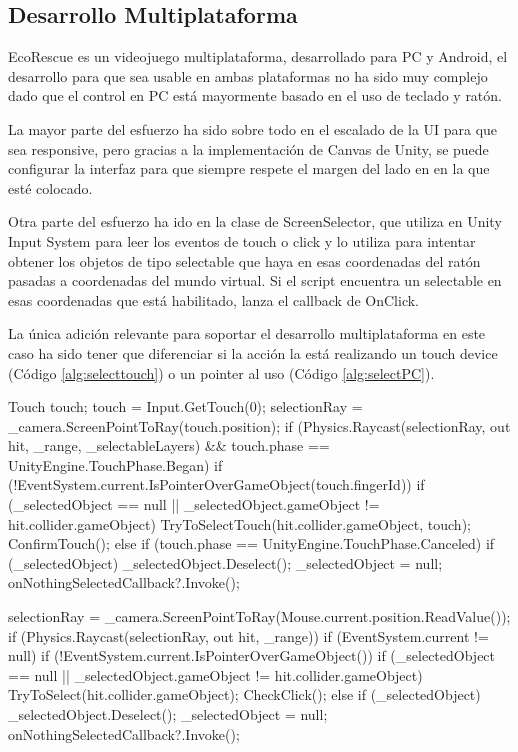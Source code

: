 \subsection{Desarrollo Multiplataforma}

EcoRescue es un videojuego multiplataforma, desarrollado para PC y Android, el desarrollo para que sea usable en ambas plataformas no ha sido muy complejo dado que el control en PC está mayormente basado en el uso de teclado y ratón.

La mayor parte del esfuerzo ha sido sobre todo en el escalado de la UI para que sea responsive, pero gracias a la implementación de Canvas\cite{unitycanvas} de Unity, se puede configurar la interfaz para que siempre respete el margen del lado en en la que esté colocado.

Otra parte del esfuerzo ha ido en la clase de ScreenSelector, que utiliza en Unity Input System\cite{unityinputsystem} para leer los eventos de touch o click y lo utiliza para intentar obtener los objetos de tipo selectable que haya en esas coordenadas del ratón pasadas a coordenadas del mundo virtual. Si el script encuentra un selectable en esas coordenadas que está habilitado, lanza el callback de OnClick.

La única adición relevante para soportar el desarrollo multiplataforma en este caso ha sido tener que diferenciar si la acción la está realizando un touch device (Código \ref{alg:selecttouch}) o un pointer al uso (Código \ref{alg:selectPC}).

\begin{mypython}[caption={Código para seleccionar una entidad en un 'Touch Device'.},label={alg:selecttouch}]
Touch touch;
touch = Input.GetTouch(0);
selectionRay = _camera.ScreenPointToRay(touch.position);
if (Physics.Raycast(selectionRay, out hit, _range, _selectableLayers) && touch.phase == UnityEngine.TouchPhase.Began)
{
    if (!EventSystem.current.IsPointerOverGameObject(touch.fingerId))
    {
        if (_selectedObject == null || _selectedObject.gameObject != hit.collider.gameObject)
        {
            TryToSelectTouch(hit.collider.gameObject, touch);
        }
        ConfirmTouch();
    }
}
else if (touch.phase == UnityEngine.TouchPhase.Canceled)
{
    if (_selectedObject)
    {
        _selectedObject.Deselect();
        _selectedObject = null;
        onNothingSelectedCallback?.Invoke();
    }
}
\end{mypython}

\begin{mypython}[caption={Código para seleccionar una entidad en PC.},label={alg:selectPC}]
selectionRay = _camera.ScreenPointToRay(Mouse.current.position.ReadValue());
if (Physics.Raycast(selectionRay, out hit, _range))
{
    if (EventSystem.current != null)
    {
        if (!EventSystem.current.IsPointerOverGameObject())
        {
            if (_selectedObject == null || _selectedObject.gameObject != hit.collider.gameObject)
            {
                TryToSelect(hit.collider.gameObject);
            }
            CheckClick();
        }
    }
}
else
{
    if (_selectedObject)
    {
        _selectedObject.Deselect();
        _selectedObject = null;
        onNothingSelectedCallback?.Invoke();
    }
}
\end{mypython}

